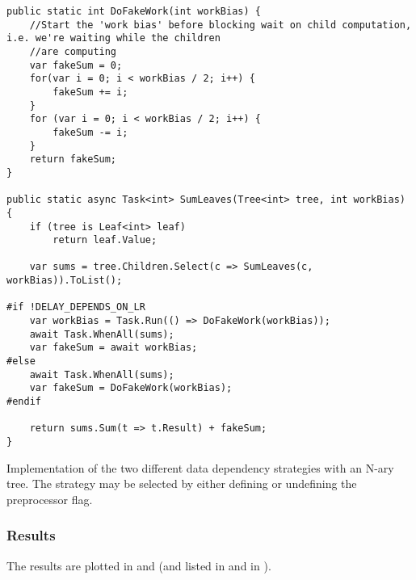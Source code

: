 \begin{listing}
    \begin{verbatim}
public static int DoFakeWork(int workBias) {
    //Start the 'work bias' before blocking wait on child computation, i.e. we're waiting while the children
    //are computing
    var fakeSum = 0;
    for(var i = 0; i < workBias / 2; i++) {
        fakeSum += i;
    }
    for (var i = 0; i < workBias / 2; i++) {
        fakeSum -= i;
    }
    return fakeSum;
}

public static async Task<int> SumLeaves(Tree<int> tree, int workBias)
{
    if (tree is Leaf<int> leaf)
        return leaf.Value;

    var sums = tree.Children.Select(c => SumLeaves(c, workBias)).ToList();

#if !DELAY_DEPENDS_ON_LR
    var workBias = Task.Run(() => DoFakeWork(workBias));
    await Task.WhenAll(sums);
    var fakeSum = await workBias;
#else
    await Task.WhenAll(sums);
    var fakeSum = DoFakeWork(workBias);
#endif

    return sums.Sum(t => t.Result) + fakeSum;
}
    \end{verbatim}
    \caption{Implementation of the two different data dependency strategies with an N-ary tree. The strategy may be selected by either defining or undefining the  preprocessor flag.}
    \label{lst:benchmark:strategies}
\end{listing}

\subsubsection{Results}
The results are plotted in  and  (and listed in  and  in ).

\newcommand{\workBiasSymbolics}{\symbolic{Work Bias (iterations),134217728,67108864,33554432,16777216,8388608,4194304,2097152,1048576,524288,262144,131072,65536,32768,16384,8192,4096,2048,1024}}


